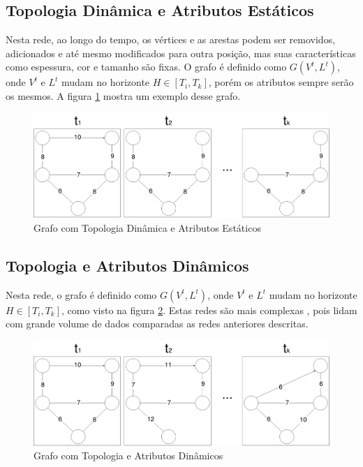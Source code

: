 \subsection{Topologia Dinâmica e Atributos Estáticos}
\label{subsec:topdinatribest}
Nesta rede, ao longo do tempo, os vértices e as arestas podem ser removidos, adicionados e até mesmo
modificados para outra posição, mas suas características como espessura, cor e tamanho são fixas.
O grafo é definido como $G(V^t, L^t)$, onde $V^t$ e $L^t$ mudam no horizonte $H \in [T_i, T_k]$,
porém os atributos sempre serão os mesmos. A figura \ref{fig:tdae} mostra um exemplo desse grafo.

\begin{figure}[htbp]
\centering
 \includegraphics[width=.80\textwidth]{chapters/fig/tdae.png}
\caption{Grafo com Topologia Dinâmica e Atributos Estáticos}
\label{fig:tdae}
\end{figure}

\FloatBarrier

\subsection{Topologia e Atributos Dinâmicos}
\label{subsec:topdinatridin}
Nesta rede, o grafo é definido como $G(V^t, L^t)$, onde $V^t$ e $L^t$ mudam no horizonte $H \in [T_i, T_k]$, como
visto na figura \ref{fig:tdat}.
Estas redes são mais complexas \cite{dynagraph}, pois lidam com grande volume de dados comparadas as redes anteriores descritas.

\begin{figure}[htbp]
\centering
 \includegraphics[width=.80\textwidth]{chapters/fig/tdat.png}
\caption{Grafo com Topologia e Atributos Dinâmicos}
\label{fig:tdat}
\end{figure}

